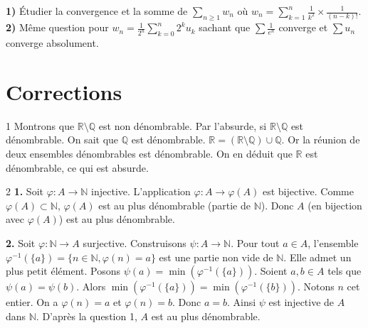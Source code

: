\begin{exercice}[title={Exercice Supplémentaire}]
\textbf{1)} Étudier la convergence et la somme de $\sum_{n\ge1} w_n$ où $w_n = \sum_{k=1}^n \frac{1}{k^2} \times \frac{1}{(n-k)!}$.
\textbf{2)} Même question pour $w_n = \frac{1}{2^n} \sum_{k=0}^n 2^k u_k$ sachant que $\sum \frac{1}{e^n}$ converge et $\sum u_n$ converge absolument.
\end{exercice}

\newpage
\section{Corrections}

\begin{correction}{1}
Montrons que $\mathbb{R} \setminus \mathbb{Q}$ est non dénombrable.
Par l'absurde, si $\mathbb{R} \setminus \mathbb{Q}$ est dénombrable.
On sait que $\mathbb{Q}$ est dénombrable.
$\mathbb{R} = (\mathbb{R} \setminus \mathbb{Q}) \cup \mathbb{Q}$.
Or la réunion de deux ensembles dénombrables est dénombrable.
On en déduit que $\mathbb{R}$ est dénombrable, ce qui est absurde.
\end{correction}

\begin{correction}{2}
\textbf{1.} Soit $\varphi : A \to \mathbb{N}$ injective.
L'application $\varphi : A \to \varphi(A)$ est bijective.
Comme $\varphi(A) \subset \mathbb{N}$, $\varphi(A)$ est au plus dénombrable (partie de $\mathbb{N}$).
Donc $A$ (en bijection avec $\varphi(A)$) est au plus dénombrable.

\textbf{2.} Soit $\varphi : \mathbb{N} \to A$ surjective.
Construisons $\psi : A \to \mathbb{N}$.
Pour tout $a \in A$, l'ensemble $\varphi^{-1}(\{a\}) = \{n \in \mathbb{N}, \varphi(n)=a\}$ est une partie non vide de $\mathbb{N}$.
Elle admet un plus petit élément. Posons $\psi(a) = \min(\varphi^{-1}(\{a\}))$.
Soient $a, b \in A$ tels que $\psi(a) = \psi(b)$.
Alors $\min(\varphi^{-1}(\{a\})) = \min(\varphi^{-1}(\{b\}))$. Notons $n$ cet entier.
On a $\varphi(n) = a$ et $\varphi(n) = b$. Donc $a=b$.
Ainsi $\psi$ est injective de $A$ dans $\mathbb{N}$.
D'après la question 1, $A$ est au plus dénombrable.
\end{correction}

